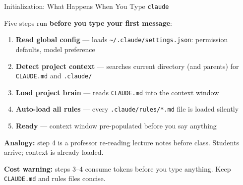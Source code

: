 \documentclass[10pt,english,aspectratio=169]{beamer}
\begin{document}
\begin{frame}{Initialization: What Happens When You Type \texttt{claude}}

Five steps run \textbf{before you type your first message}:

\vspace{0.2cm}

\begin{enumerate}
    \item \textbf{Read global config} --- loads \texttt{\textasciitilde/.claude/settings.json}: permission defaults, model preference

    \vspace{0.1cm}

    \item \textbf{Detect project context} --- searches current directory (and parents) for \texttt{CLAUDE.md} and \texttt{.claude/}

    \vspace{0.1cm}

    \item \textbf{Load project brain} --- reads \texttt{CLAUDE.md} into the context window

    \vspace{0.1cm}

    \item \textbf{Auto-load all rules} --- every \texttt{.claude/rules/*.md} file is loaded silently

    \vspace{0.1cm}

    \item \textbf{Ready} --- context window pre-populated before you say anything
\end{enumerate}

\vspace{0.25cm}

\textbf{Analogy:} step 4 is a professor re-reading lecture notes before class. Students arrive; context is already loaded.

\vspace{0.1cm}

\textbf{Cost warning:} steps 3--4 consume tokens before you type anything. Keep \texttt{CLAUDE.md} and rules files concise.
\end{frame}
\end{document}
